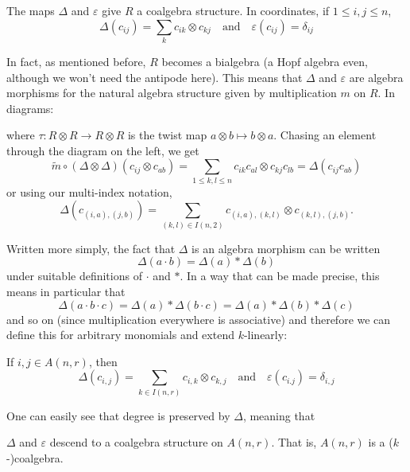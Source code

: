 \documentclass[12pt]{article}
\begin{document}
\begin{prop}
	The maps $\Delta$ and $\varepsilon$ give $R$ a coalgebra structure. In coordinates, if $1\le i,j\le n$,
	\[\Delta(c_{ij})=\sum_k c_{ik}\otimes c_{kj}\quad\text{and}\quad \varepsilon(c_{ij})=\delta_{ij}\]
\end{prop}
In fact, as mentioned before, $R$ becomes a bialgebra (a Hopf algebra even, although we won't need the antipode here). This means that 
$\Delta$ and $\varepsilon$ are algebra morphisms for the natural algebra structure given by multiplication $m$ on $R$. In diagrams:
\begin{center}
	\quad{}
\end{center}
where $\tau:R\otimes R\to R\otimes R$ is the twist map $a\otimes b\mapsto b\otimes a$. 
Chasing an element through the diagram on the left, we get
\[\tilde m\circ (\Delta\otimes \Delta)(c_{ij}\otimes c_{ab})=\sum_{1\le k,l\le n}c_{ik}c_{al}\otimes c_{kj}c_{lb}=\Delta(c_{ij}{c_{ab}})\]
or using our multi-index notation,
\[\Delta(c_{(i,a),(j,b)})=\sum_{(k,l)\in I(n,2)}c_{(i,a),(k,l)}\otimes c_{(k,l),(j,b)}.\]

Written more simply, the fact that $\Delta$ is an algebra morphism can be written 
\[\Delta(a\cdot b)=\Delta(a)\ast\Delta(b)\]
under suitable definitions of $\cdot$ and $\ast$. In a way that can be made precise, this means in particular that 
\[\Delta(a\cdot b\cdot c)=\Delta(a)\ast\Delta(b\cdot c)=\Delta(a)\ast\Delta(b)\ast\Delta(c)\]
and so on (since multiplication everywhere is associative) and therefore we can define this for arbitrary monomials and extend $k$-linearly: 
\begin{prop}
	If $i,j\in A(n,r)$, then 
	\[\Delta(c_{i,j})=\sum_{k\in I(n,r)}c_{i,k}\otimes c_{k,j}\quad\text{and}\quad \varepsilon(c_{i.j})=\delta_{i,j}\]
\end{prop}
One can easily see that degree is preserved by $\Delta$, meaning that 
\begin{prop}
	$\Delta$ and $\varepsilon$ descend to a coalgebra structure on $A(n,r)$. That is, $A(n,r)$ is a ($k$-)coalgebra.
\end{prop}
\end{document}
